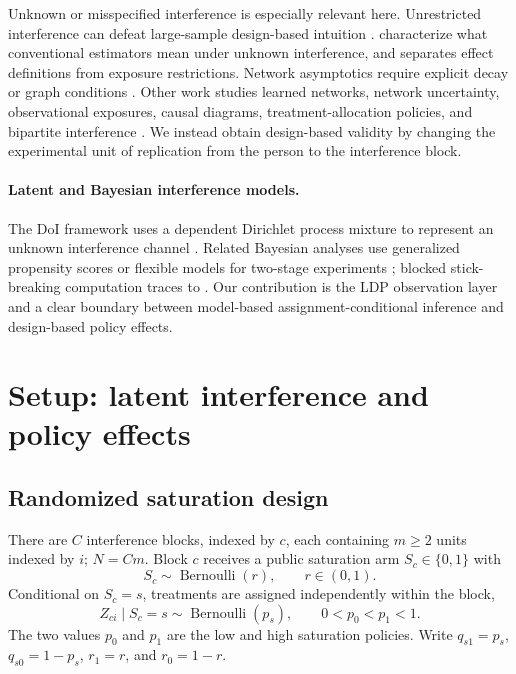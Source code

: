\documentclass[11pt]{article}
\theoremstyle{definition}
\theoremstyle{remark}
\DeclareMathOperator{\Bern}{Bernoulli}
\begin{document}
Unknown or misspecified interference is especially relevant here. Unrestricted interference
can defeat large-sample design-based intuition \citep{BasseAiroldi2018}.
\citet{SavjeAronowHudgens2021} characterize what conventional estimators mean under unknown
interference, and \citet{Savje2024} separates effect definitions from exposure restrictions.
Network asymptotics require explicit decay or graph conditions
\citep{Leung2020,Leung2022,LiWager2022}. Other work studies learned networks, network
uncertainty, observational exposures, causal diagrams, treatment-allocation policies, and
bipartite interference
\citep{BhattacharyaMalinskyShpitser2020,ForastiereAiroldiMealli2021,
OgburnVanderWeele2014,PapadogeorgouMealliZigler2019,ZiglerPapadogeorgou2021,
HarshawEtAl2023}. We instead obtain design-based validity by changing the experimental unit of
replication from the person to the interference block.

\paragraph{Latent and Bayesian interference models.}
The DoI framework uses a dependent Dirichlet process mixture to represent an unknown
interference channel \citep{OhnishiKarmakarSabbaghi2025}. Related Bayesian analyses use
generalized propensity scores or flexible models for two-stage experiments
\citep{ForastiereEtAl2022,OhnishiSabbaghi2024}; blocked stick-breaking computation traces to
\citet{IshwaranJames2001}. Our contribution is the LDP observation layer and a clear boundary
between model-based assignment-conditional inference and design-based policy effects.

\section{Setup: latent interference and policy effects}
\label{sec:setup}

\subsection{Randomized saturation design}

There are $C$ interference blocks, indexed by $c$, each containing $m\ge2$ units indexed by $i$;
$N=Cm$. Block $c$ receives a public saturation arm $S_c\in\{0,1\}$ with
\[
  S_c\sim\Bern(r), \qquad r\in(0,1).
\]
Conditional on $S_c=s$, treatments are assigned independently within the block,
\[
  Z_{ci}\mid S_c=s\sim\Bern(p_s), \qquad 0<p_0<p_1<1.
\]
The two values $p_0$ and $p_1$ are the low and high saturation policies. Write
$q_{s1}=p_s$, $q_{s0}=1-p_s$, $r_1=r$, and $r_0=1-r$.
\end{document}
